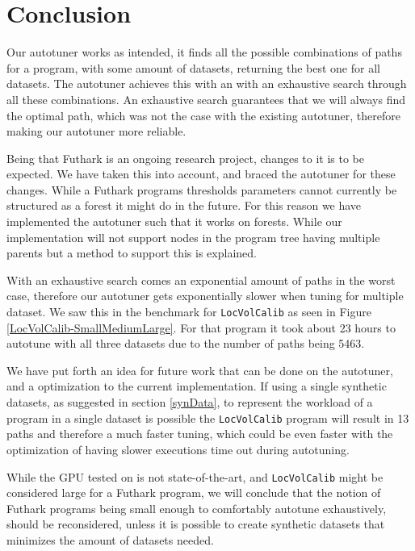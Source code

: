 \section{Conclusion}
\label{conclusion}
Our autotuner works as intended, it finds all the possible combinations of paths for a program, with some amount of datasets, returning the best one for all datasets. The autotuner achieves this with an with an exhaustive search through all these combinations. An exhaustive search guarantees that we will always find the optimal path, which was not the case with the existing autotuner, therefore making our autotuner more reliable.

Being that Futhark is an ongoing research project, changes to it is to be
expected. We have taken this into account, and braced the autotuner for these
changes. While a Futhark programs thresholds parameters cannot currently be
structured as  a forest it might do in the future. For this reason we have
implemented the autotuner such that it works on forests. While our
implementation will not support nodes in the program tree having multiple
parents but a method to support this is explained.

With an exhaustive search comes an exponential amount of paths in the worst case, therefore our autotuner gets exponentially slower when tuning for multiple dataset. We saw this in the benchmark for \texttt{LocVolCalib} as seen in Figure \ref{LocVolCalib-SmallMediumLarge}. For that program it took about 23 hours to autotune with all three datasets due to the number of paths being 5463. 

We have put forth an idea for future work that can be done on the autotuner,
and a optimization to the current implementation. If using a single synthetic datasets,
as suggested in section \ref{synData}, to represent the workload of
a program in a single dataset is possible the \texttt{LocVolCalib} program will
result in 13 paths and therefore a much faster tuning, which could be even
faster with the optimization of having slower executions time out during
autotuning.

While the GPU tested on is not state-of-the-art, and \texttt{LocVolCalib} might
be considered large for a Futhark program, we will conclude that the notion of
Futhark programs being small enough to comfortably autotune exhaustively,
should be reconsidered, unless it is possible to create synthetic datasets that
minimizes the amount of datasets needed.
